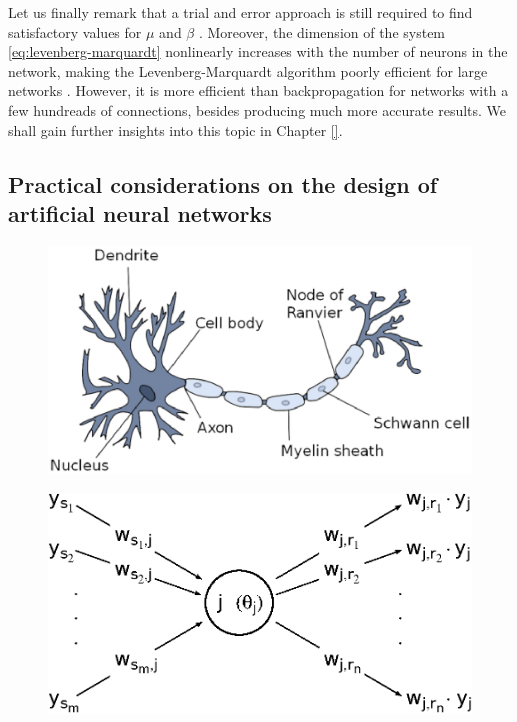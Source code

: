 \documentclass[11pt, a4paper]{report}
\numberwithin{equation}{chapter}
\theoremstyle{theorem}
\theoremstyle{definition}
\numberwithin{figure}{section}
\begin{document}
		Let us finally remark that a trial and error approach is still required to find satisfactory values for $\mu$ and $\beta$ \cite{Mar63}. Moreover, the dimension of the system \eqref{eq:levenberg-marquardt} nonlinearly increases with the number of neurons in the network, making the Levenberg-Marquardt algorithm poorly efficient for large networks \cite{Hag94}. However, it is more efficient than backpropagation for networks with a few hundreads of connections, besides producing much more accurate results. We shall gain further insights into this topic in Chapter \ref{}.
		
		\subsection{Practical considerations on the design of artificial neural networks}
		\label{section:Practical considerations on the design of artificial neural networks}
		
		\clearpage
		
		 
		\begin{figure}[H]
			\center
			\includegraphics[scale = 0.5]{neuron.eps}
			
			\caption{}
			\label{fig:neuron}
		\end{figure}
		
		\begin{figure}[H]
			\center
			\includegraphics[scale = 0.7]{neural_model_ter.eps}
			
			\caption{}
			\label{fig:neural-model}
		\end{figure}
		
\end{document}
